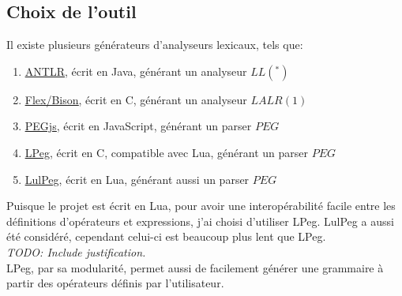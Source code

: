 \documentclass{article}
\begin{document}
\subsection{Choix de l'outil}
Il existe plusieurs générateurs d'analyseurs lexicaux, tels que: \begin{enumerate}
	\item \underline{\href{http://www.antlr.org/about.html}{ANTLR}}, écrit en Java, générant un analyseur $LL(^*)$
	\item \underline{\href{http://dinosaur.compilertools.net/}{Flex/Bison}}, écrit en C, générant un analyseur $LALR(1)$
	\item \underline{\href{https://pegjs.org/}{PEGjs}}, écrit en JavaScript, générant un parser $PEG$
	\item \underline{\href{https://github.com/LuaDist/lpeg}{LPeg}}, écrit en C, compatible avec Lua, générant un parser $PEG$
	\item \underline{\href{https://github.com/pygy/LuLPeg}{LulPeg}}, écrit en Lua, générant aussi un parser $PEG$
\end{enumerate}
Puisque le projet est écrit en Lua, pour avoir une interopérabilité facile entre les définitions d'opérateurs et expressions, j'ai choisi d'utiliser LPeg. LulPeg a aussi été considéré, cependant celui-ci est beaucoup plus lent que LPeg. \\ \textit{TODO: Include justification.} \\ LPeg, par sa modularité, permet aussi de facilement générer une grammaire à partir des opérateurs définis par l'utilisateur.
\end{document}
